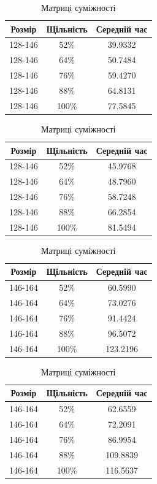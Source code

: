 \documentclass[titlepage, a4paper]{article}
\begin{document}
\begin{table}[htbp]
\begin{minipage}[b]{0.51\linewidth}
\begin{tabular}{|c|c|c|}
\hline
Розмір & Щільність & Середній час\\
\hline
128-146 & 52\% & 39.9332 \\
128-146 & 64\% &50.7484 \\
128-146 & 76\% & 59.4270 \\
128-146 & 88\% & 64.8131 \\
128-146 & 100\% & 77.5845 \\
\hline
\end{tabular}
\caption{Списки суміжності}
\end{minipage}
\begin{minipage}[b]{0.51\linewidth}
\begin{tabular}{|c|c|c|}
\hline
Розмір & Щільність & Середній час\\
\hline
128-146 & 52\% & 45.9768 \\
128-146 & 64\% &48.7960 \\
128-146 & 76\% &58.7248 \\
128-146 & 88\% & 66.2854 \\
128-146 & 100\% & 81.5494 \\
\hline
\end{tabular}
\caption{Матриці суміжності}
\end{minipage}
\end{table}
\begin{table}[htbp]
\begin{minipage}[b]{0.51\linewidth}
\begin{tabular}{|c|c|c|}
\hline
Розмір & Щільність & Середній час\\
\hline
146-164 & 52\% & 60.5990 \\
146-164 & 64\% & 73.0276 \\
146-164 & 76\% & 91.4424 \\
146-164 & 88\% & 96.5072 \\
146-164 & 100\% & 123.2196 \\
\hline
\end{tabular}
\caption{Списки суміжності}
\end{minipage}
\begin{minipage}[b]{0.51\linewidth}
\begin{tabular}{|c|c|c|}
\hline
Розмір & Щільність & Середній час\\
\hline
146-164 & 52\% & 62.6559 \\
146-164 & 64\% & 72.2091 \\
146-164 & 76\% & 86.9954 \\
146-164 & 88\% & 109.8839 \\
146-164 & 100\% & 116.5637 \\
\hline
\end{tabular}
\caption{Матриці суміжності}
\end{minipage}
\end{table}
\end{document}
